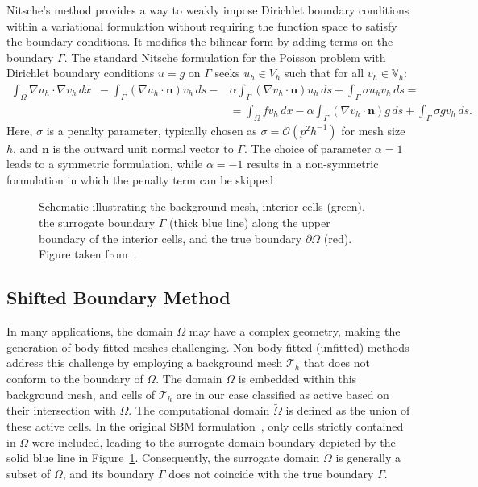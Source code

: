 \documentclass{elsarticle}
\begin{document}
Nitsche's method provides a way to weakly impose Dirichlet boundary conditions within a variational formulation without
requiring the function space to satisfy the boundary conditions. It modifies the bilinear form by adding terms on the
boundary $\Gamma$. The standard Nitsche formulation for the Poisson problem with Dirichlet boundary conditions $u=g$ on
$\Gamma$ seeks $u_h \in V_h$ such that for all $v_h \in \mathbb{V}_h$:
\begin{equation*}
    \begin{split}
        \int_\Omega \nabla u_h \cdot \nabla v_h \, dx
        \;\; - \int_{\Gamma} (\nabla u_h \cdot \mathbf{n}) v_h \, ds
        - & \alpha\int_{\Gamma} (\nabla v_h \cdot \mathbf{n}) u_h \, ds
        + \int_{\Gamma} \sigma u_h v_h \, ds =                          \\
          & = \int_\Omega f v_h \, dx
        - \alpha\int_{\Gamma} (\nabla v_h \cdot \mathbf{n}) g \, ds
        + \int_{\Gamma} \sigma g v_h \, ds.
    \end{split}
\end{equation*}
Here, $\sigma$ is a penalty parameter, typically chosen as $\sigma = \mathcal{O}(p^2 h^{-1})$ for mesh
size $h$, and
$\mathbf{n}$ is the outward unit normal vector to $\Gamma$.  The choice of parameter $\alpha=1$ leads to a symmetric
formulation, while $\alpha=-1$ results in a non-symmetric formulation in which the penalty term can be
skipped~\cite{baumann1999discontinuous}

\begin{figure}[!ht]
    
    \caption{Schematic illustrating the background mesh, interior cells (green), the surrogate boundary
        $\tilde{\Gamma}$ (thick blue line) along the upper boundary of the interior cells, and the true boundary
        $\partial\Omega$ (red). Figure taken from~\cite{wichrowski2025geometric}.}
    \label{fig:sbm_setup}
\end{figure}

\subsection{Shifted Boundary Method}
In many applications, the domain $\Omega$ may have a complex geometry, making the generation of body-fitted meshes
challenging. Non-body-fitted (unfitted) methods address this challenge by employing a background mesh $\mathcal{T}_h$
that does not conform to the boundary of $\Omega$. The domain $\Omega$ is embedded within this background mesh, and
cells of $\mathcal{T}_h$ are in our case classified as active based on their intersection with $\Omega$. The
computational domain $\tilde{\Omega}$ is defined as the union of these active cells. In the original SBM
formulation~\cite{main2018shifted}, only cells strictly contained in $\Omega$ were included, leading to the surrogate
domain boundary depicted by the solid blue line in Figure~\ref{fig:sbm_setup}. Consequently, the surrogate domain
$\tilde{\Omega}$ is generally a subset of $\Omega$, and its boundary $\tilde{\Gamma}$ does not coincide with the true
boundary $\Gamma$.
\end{document}
